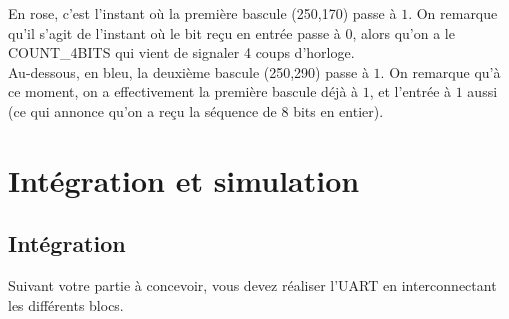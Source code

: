 \documentclass[a4paper]{article} %
\begin{document}
En rose, c'est l'instant où la première bascule (250,170) passe à $1$. On remarque qu'il s'agit de l'instant où le bit reçu en entrée  passe à $0$, alors qu'on a le COUNT\_4BITS qui vient de signaler 4 coups d'horloge.\\
Au-dessous, en bleu, la deuxième bascule (250,290) passe à $1$. On remarque qu'à ce moment, on a effectivement la première bascule déjà à $1$, et l'entrée  à $1$ aussi (ce qui annonce qu'on a reçu la séquence de 8 bits en entier).
\section {Intégration et simulation}
\subsection{Intégration}
Suivant votre partie à concevoir, vous devez réaliser l’UART en interconnectant les différents blocs. 
\end{document}
